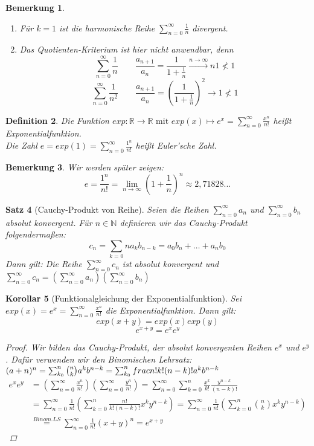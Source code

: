 \documentclass[a4paper,titlepage,oneside]{article}
\def\N{\ensuremath{\mathbb{N}} }
\def\R{\ensuremath{\mathbb{R}} }
\def\e{\ensuremath{\mathit{e}}}
\newcommand{\suminf}[2][n]{\ensuremath{\sum_{#1= 0}^{\infty}{#2}}}
\renewcommand{\liminf}[2][n]{\ensuremath{\lim\limits_{#1 \rightarrow \infty}{#2}}}
\newcommand{\longtoinf}[1][n]{\ensuremath{\overset{\scriptscriptstyle{#1 \to \infty}}{\longrightarrow}}}
\theoremstyle{thmstyle}
\newtheorem{satz}{Satz}[subsection]
\newtheorem{korr}[satz]{Korollar}
\newtheorem{defi}[satz]{Definition}
\newtheorem{bem}[satz]{Bemerkung}
\begin{document}
\begin{bem}
\begin{enumerate}
\item Für \(k = 1\) ist die harmonische Reihe \suminf{\frac{1}{n}} divergent.
\item Das Quotienten-Kriterium ist hier nicht anwendbar, denn \\
\[\suminf{\frac{1}{n}} \qquad \frac{a_{n+1}}{a_n} = \frac{1}{1 + \frac{1}{n}} \longtoinf{n} 1 \not < 1\]
\[\suminf{\frac{1}{n^2}} \qquad \frac{a_{n+1}}{a_n} = \left(\frac{1}{1 + \frac{1}{n}}\right)^2 \longrightarrow 1 \not < 1\]
\end{enumerate}
\end{bem}

\begin{defi}
Die Funktion \(exp: \R \to \R \text{ mit } exp(x) \mapsto \e^x = \suminf{\frac{x^n}{n!}}\) heißt Exponentialfunktion.\\
Die Zahl \(\e = exp(1) = \suminf{\frac{1^n}{n!}} \) heißt Euler'sche Zahl.
\end{defi}

\begin{bem}
Wir werden später zeigen:
\[\e = \frac{1^n}{n!} = \liminf{\left(1 + \frac{1}{n}\right)^n} \approx 2,71828...\]
\end{bem}

\begin{satz}[Cauchy-Produkt von Reihe]
Seien die Reihen \suminf{a_n} und \suminf{b_n} absolut konvergent. Für $n \in \N$ definieren wir das Cauchy-Produkt folgendermaßen:
\[c_n = \sum_{k = 0}{n}{a_kb_{n-k}} = a_0b_n + \dots + a_nb_0\]
Dann gilt: Die Reihe \suminf{c_n} ist absolut konvergent und $\suminf{c_n} = \left( \suminf{a_n} \right)  \left( \suminf{b_n} \right) $
\proof[Beweisidee] 
\end{satz}

\begin{korr}[Funktionalgleichung der Exponentialfunktion]
Sei $exp(x) = \e^x = \suminf{\frac{x^n}{n!}}$ die Exponentialfunktion. Dann gilt:
\[exp(x+y) = exp(x) exp(y)\]
\[e^{x+y} = e^x e^y\]
\begin{proof}
Wir bilden das Cauchy-Produkt, der absolut konvergenten Reihen $e^x$ und $ e^y$. Dafür verwenden wir den Binomischen Lehrsatz: $(a+n)^n = \sum_{k_0}^{n}{\binom{n}{k}a^kb^{n-k}} = \sum_{k_0}^{n}{\\frac{n!}{k!(n-k)!}a^kb^{n-k}}$\\
\begin{math} \displaystyle
\begin{aligned}
e^x e^y &= \left(\suminf{\frac{x^n}{n!}}\right)\left(\suminf{\frac{y^n}{n!}}\right) = \suminf{\sum_{k = 0}^{n}{\frac{x^k}{k!}\frac{y^{n-k}}{(n-k)!}}} \\
&= \suminf{\frac{1}{n!}\left(\sum_{k = 0}^{n}{\frac{n!}{k!(n-k)!}x^ky^{n-k}}\right)} = \suminf{\frac{1}{n!}\left(\sum_{k = 0}^{n}{\binom{n}{k}x^ky^{n-k}}\right)}\\
& \overset{Binom.LS}{=} \suminf{\frac{1}{n!}(x+y)^n} = e^{x+y}
\end{aligned}
\end{math}
\end{proof}
\end{korr}
\end{document}
